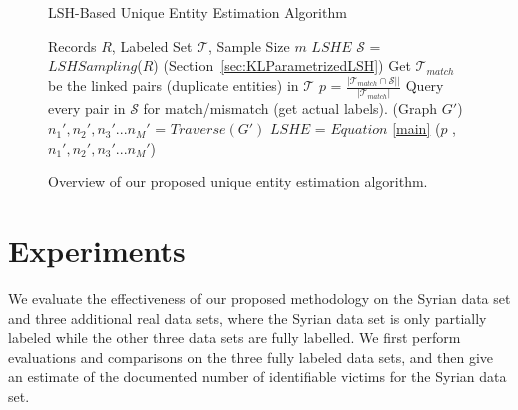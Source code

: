 \documentclass[aoas]{imsart}
\begin{document}
\begin{figure}
	\begin{minipage}{\textwidth}
		\begin{algorithm}[H]
			\caption{LSH-Based Unique Entity Estimation Algorithm}
			\label{Est}
			\begin{algorithmic}[1]
				 Records $R$, Labeled Set $\mathcal{T}$, Sample Size $m$
				 $LSHE$
				\STATE $\mathcal{S}$ = $LSH Sampling$($R$) (Section~\ref{sec:KLParametrizedLSH})
                \STATE Get $\mathcal{T}_{match}$ be the linked pairs (duplicate entities) in $\mathcal{T}$
				\STATE $p$ = $\frac{|\mathcal{T}_{match} \cap \mathcal{S}||}{|\mathcal{T}_{match}|}$
                \STATE Query every pair in $\mathcal{S}$ for match/mismatch (get actual labels). (Graph $G'$)
				\STATE $n_1', n_2', n_3'... n_M'$ = $Traverse(G')$
				\STATE $LSHE$ = $Equation$ \ref{main} ($p$ , $n_1', n_2', n_3'... n_M'$)
			\end{algorithmic}
		\end{algorithm}
	\end{minipage}
	\caption{Overview of our proposed unique entity estimation algorithm.}
\label{samplep}
	\end{figure}

\section{Experiments}
\label{experiments}

We evaluate the effectiveness of our proposed methodology on the Syrian data set and three additional real data sets, where the Syrian data set is only partially labeled while the other three data sets are fully labelled. We first perform evaluations and comparisons on the three fully labeled data sets, and then give an estimate of the documented number of identifiable victims for the Syrian data set.
\end{document}
